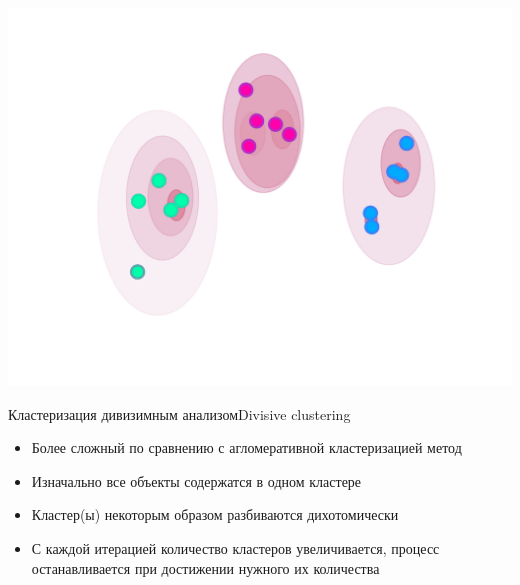 \documentclass[compress,unicode]{beamer}
\begin{document}
\begin{frame}{}
\begin{block}{}
\scriptsize

\end{block}
\end{frame}

\begin{frame}{}
\includegraphics[width=\textwidth]{aglomerative}
\end{frame}


\begin{frame}{Кластеризация дивизимным анализом}{Divisive clustering}

\begin{itemize}
\item Более сложный по сравнению с агломеративной кластеризацией метод
\item Изначально все объекты содержатся в одном кластере
\item Кластер(ы) некоторым образом разбиваются дихотомически
\item С каждой итерацией количество кластеров увеличивается, процесс останавливается при достижении нужного их количества
\end{itemize}
\end{frame}
\end{document}
